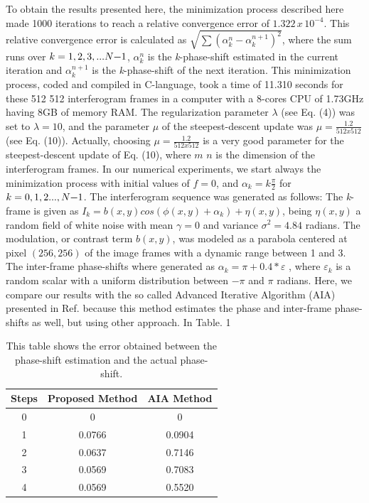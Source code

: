 To obtain the results presented here, the minimization process described
here made 1000 iterations to reach a relative convergence error of
$1.322\, x\,10^{-4}$. This relative convergence error is calculated
as $\sqrt{\sum(\alpha_{k}^{n}-\alpha_{k}^{n+1})^{2}}$, where the
sum runs over $k=1,2,3,...N\text{\textminus}1$, $\alpha_{k}^{n}$
is the \emph{k}-phase-shift estimated in the current iteration and
$\alpha_{k}^{n+1}$ is the \emph{k}-phase-shift of the next iteration.
This minimization process, coded and compiled in C-language, took
a time of 11.310 seconds for these 512 \texttimes{} 512 interferogram
frames in a computer with a 8-cores CPU of 1.73GHz having 8GB of memory
RAM. The regularization parameter $\lambda$ (see Eq. (4)) was set
to $\lambda=10$, and the parameter $\mu$ of the steepest-descent
update was $\mu=\frac{1.2}{512x512}$ (see Eq. (10)). Actually, choosing
$\mu=\frac{1.2}{512x512}$ is a very good parameter for the steepest-descent
update of Eq. (10), where $m$ \texttimes{} $n$ is the dimension
of the interferogram frames. In our numerical experiments, we start
always the minimization process with initial values of $f=0$, and
$\alpha_{k}=k\frac{\pi}{2}$ for $k=0,1,2...,N\text{\textminus}1$.
The interferogram sequence was generated as follows: The \emph{k}-frame
is given as $I_{k}=b(x,y)cos(\phi(x,y)+\alpha_{k})+\eta(x,y)$, being
$\eta(x,y)$ a random field of white noise with mean $\gamma=0$ and
variance $\sigma^{2}=4.84$ radians. The modulation, or contrast term
$b(x,y)$, was modeled as a parabola centered at pixel $(256,256)$
of the image frames with a dynamic range between 1 and 3. The inter-frame
phase-shifts where generated as $\alpha_{k}=\pi+0.4*\varepsilon$
, where $\varepsilon_{k}$ is a random scalar with a uniform distribution
between $-\pi$ and $\pi$ radians. Here, we compare our results with
the so called Advanced Iterative Algorithm (AIA) presented in Ref.
\cite{a15} because this method estimates the phase and inter-frame
phase-shifts as well, but using other approach. In Table. 1
\begin{table}
\begin{centering}
\begin{tabular}{|c|c|c|}
\hline 
Steps & Proposed Method & AIA Method\tabularnewline
\hline 
\hline 
0 & 0 & 0\tabularnewline
\hline 
1 & 0.0766 & 0.0904\tabularnewline
\hline 
2 & 0.0637 & 0.7146\tabularnewline
\hline 
3 & 0.0569 & 0.7083\tabularnewline
\hline 
4 & 0.0569 & 0.5520\tabularnewline
\hline 
\end{tabular}
\par\end{centering}

\caption{This table shows the error obtained between the phase-shift estimation
and the actual phase-shift.}
\end{table}
